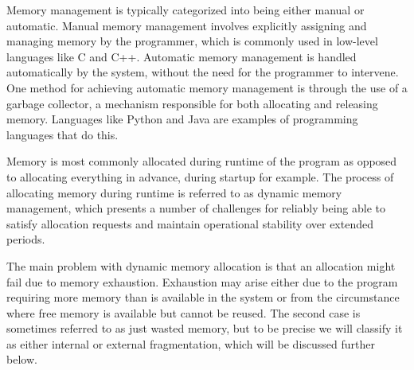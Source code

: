 
Memory management is typically categorized into being either manual or automatic. Manual memory management involves explicitly assigning and managing memory by the programmer, which is commonly used in low-level languages like C and C++. Automatic memory management is handled automatically by the system, without the need for the programmer to intervene. One method for achieving automatic memory management is through the use of a garbage collector, a mechanism responsible for both allocating and releasing memory. Languages like Python and Java are examples of programming languages that do this.

Memory is most commonly allocated during runtime of the program as opposed to allocating everything in advance, during startup for example. The process of allocating memory during runtime is referred to as dynamic memory management, which presents a number of challenges for reliably being able to satisfy allocation requests and maintain operational stability over extended periods.

The main problem with dynamic memory allocation is that an allocation might fail due to memory exhaustion. Exhaustion may arise either due to the program requiring more memory than is available in the system or from the circumstance where free memory is available but cannot be reused. The second case is sometimes referred to as just wasted memory, but to be precise we will classify it as either internal or external fragmentation, which will be discussed further below.

